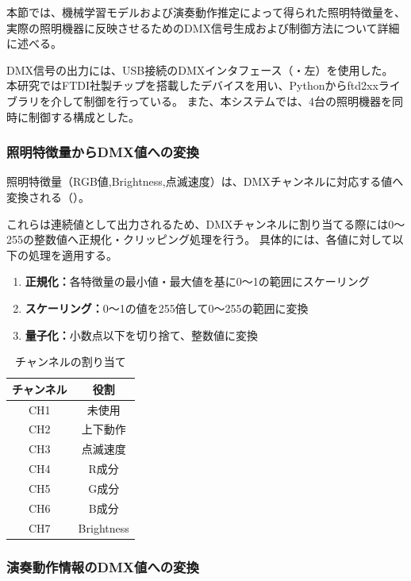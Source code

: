 本節では、機械学習モデルおよび演奏動作推定によって得られた照明特徴量を、実際の照明機器に反映させるためのDMX信号生成および制御方法について詳細に述べる。

DMX信号の出力には、USB接続のDMXインタフェース（・左）を使用した。
本研究ではFTDI社製チップを搭載したデバイスを用い、Pythonからftd2xxライブラリを介して制御を行っている。
また、本システムでは、4台の照明機器を同時に制御する構成とした。

\subsubsection{照明特徴量からDMX値への変換}

照明特徴量（RGB値,Brightness,点滅速度）は、DMXチャンネルに対応する値へ変換される（）。

これらは連続値として出力されるため、DMXチャンネルに割り当てる際には0〜255の整数値へ正規化・クリッピング処理を行う。
具体的には、各値に対して以下の処理を適用する。

\begin{enumerate}
	\item \textbf{正規化：}各特徴量の最小値・最大値を基に0〜1の範囲にスケーリング
	\item \textbf{スケーリング：}0〜1の値を255倍して0〜255の範囲に変換
	\item \textbf{量子化：}小数点以下を切り捨て、整数値に変換
\end{enumerate}

\begin{table}[tb]
	\centering
	\small
	\caption{チャンネルの割り当て}\label{tab:channel}
	\begin{tabular}{c|c}
		\hline
		\hline
		チャンネル & 役割         \\
		\hline
		CH1   & 未使用        \\
		CH2   & 上下動作       \\
		CH3   & 点滅速度       \\
		CH4   & R成分        \\
		CH5   & G成分        \\
		CH6   & B成分        \\
		CH7   & Brightness \\
		\hline
	\end{tabular}
\end{table}

\subsubsection{演奏動作情報のDMX値への変換}

